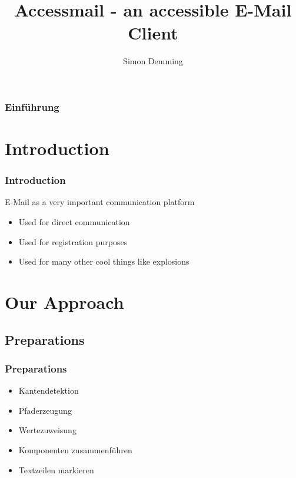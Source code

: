 \documentclass[9pt]{beamer}
\title{Accessmail - an accessible E-Mail Client}
\author{Simon Demming}
\institute[Department]{\par\smallskip\smallskip Department for Rehabilitation\\ Department for Computer Science}
\begin{document}
	\begin{frame}
		\setcounter{framenumber}{0}
	    \titlepage
	\end{frame}
	
	\begin{frame}
	    \frametitle{Einführung}
	    \tableofcontents
	\end{frame}
	
	\section{Introduction}
		\begin{frame}
			\frametitle{Introduction}
			
			E-Mail as a very important communication platform
			\begin{itemize}
				\item Used for direct communication
				\item Used for registration purposes
				\item Used for many other cool things like explosions
			\end{itemize}
		
		\end{frame}
	
	
	
	
	\section{Our Approach}
		\subsection{Preparations}
		
			\begin{frame}
				\frametitle{Preparations}
				\begin{itemize}
					\item Kantendetektion
					\item Pfaderzeugung
					\item Wertezuweisung
					\item Komponenten zusammenführen
					\item Textzeilen markieren
				\end{itemize}
			\end{frame}
			
\end{document}
